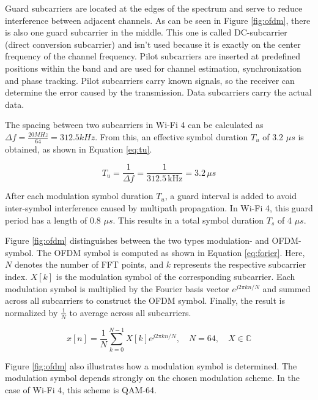 Guard subcarriers are located at the edges of the spectrum and serve to reduce interference between adjacent channels.
As can be seen in Figure \ref{fig:ofdm}, there is also one guard subcarrier in the middle.
This one is called DC-subcarrier (direct conversion subcarrier) and isn't used because it is exactly on the center frequency of the channel frequency.
Pilot subcarriers are inserted at predefined positions within the band and are used for channel estimation, synchronization and phase tracking.
Pilot subcarriers carry known signals, so the receiver can determine the error caused by the transmission.
Data subcarriers carry the actual data.

The spacing between two subcarriers in Wi-Fi 4 can be calculated as $\Delta f = \frac{20 MHz}{64} = 312.5 kHz$.
From this, an effective symbol duration $T_u$ of 3.2 $\mu s$ is obtained, as shown in Equation \ref{eq:tu}.

\begin{equation} \label{eq:tu}
T_u = \frac{1}{\Delta f} = \frac{1}{312.5 \, \text{kHz}} = 3.2 \, \mu s
\end{equation}

After each modulation symbol duration $T_u$, a guard interval is added to avoid inter-symbol interference caused by multipath propagation.
In Wi-Fi 4, this guard period has a length of 0.8 $\mu s$.
This results in a total symbol duration $T_s$ of 4 $\mu s$.

Figure \ref{fig:ofdm} distinguishes between the two types modulation- and \ac{OFDM}-symbol.
The \ac{OFDM} symbol is computed as shown in Equation \ref{eq:forier}.
Here, $N$ denotes the number of FFT points, and $k$ represents the respective subcarrier index.
$X[k]$ is the modulation symbol of the corresponding subcarrier.
Each modulation symbol is multiplied by the Fourier basis vector $e^{j2\pi kn/N}$ and summed across all subcarriers to construct the \ac{OFDM} symbol.
Finally, the result is normalized by $\frac{1}{N}$ to average across all subcarriers.

\begin{equation} \label{eq:forier}
x[n] = \frac{1}{N} \sum_{k=0}^{N-1} X[k] e^{j 2 \pi kn / N}, 
\quad N = 64, \quad X \in \mathbb{C}
\end{equation}

Figure \ref{fig:ofdm} also illustrates how a modulation symbol is determined.
The modulation symbol depends strongly on the chosen modulation scheme.
In the case of Wi-Fi 4, this scheme is \ac{QAM}-64.

